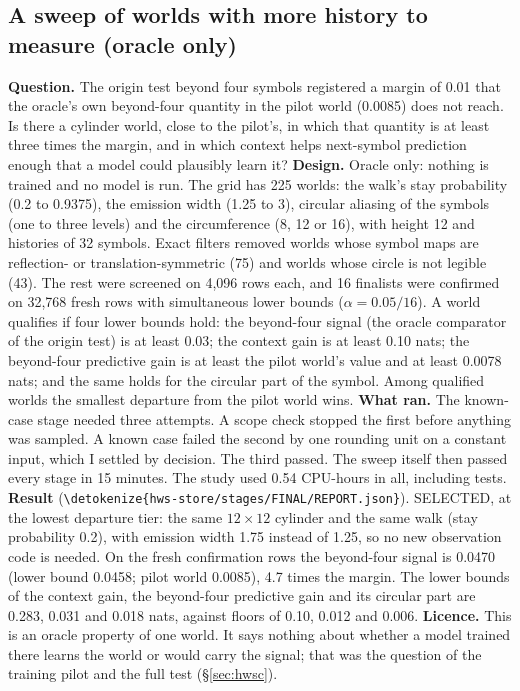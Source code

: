 \documentclass[11pt,a4paper]{article}
\DeclareRobustCommand{\_}{\ifmmode\origunderscore\else\textunderscore\allowbreak\fi}
\DeclareRobustCommand{\fpath}[1]{\begingroup\small\expandafter\nolinkurl\expandafter{\detokenize{#1}}\endgroup}
\begin{document}
\subsection{A sweep of worlds with more history to measure (oracle only)}\label{sec:hws}
\textbf{Question.} The origin test beyond four symbols registered a margin of 0.01 that the
oracle's own beyond-four quantity in the pilot world (0.0085) does not reach. Is there a
cylinder world, close to the pilot's, in which that quantity is at least three times the margin,
and in which context helps next-symbol prediction enough that a model could plausibly learn it?
\textbf{Design.} Oracle only: nothing is trained and no model is run. The grid has 225 worlds:
the walk's stay probability (0.2 to 0.9375), the emission width (1.25 to 3), circular aliasing of
the symbols (one to three levels) and the circumference (8, 12 or 16), with height 12 and
histories of 32 symbols. Exact filters removed worlds whose symbol maps are reflection- or
translation-symmetric (75) and worlds whose circle is not legible (43). The rest were screened on
4,096 rows each, and 16 finalists were confirmed on 32,768 fresh rows with simultaneous lower
bounds ($\alpha=0.05/16$). A world qualifies if four lower bounds hold: the beyond-four signal
(the oracle comparator of the origin test) is at least 0.03; the context gain is at least 0.10
nats; the beyond-four predictive gain is at least the pilot world's value and at least 0.0078
nats; and the same holds for the circular part of the symbol. Among qualified worlds the smallest
departure from the pilot world wins.
\textbf{What ran.} The known-case stage needed three attempts. A scope check stopped the first
before anything was sampled. A known case failed the second by one rounding unit on a constant
input, which I settled by decision. The third passed. The sweep itself then passed every stage
in 15 minutes. The study used 0.54 CPU-hours in all, including tests.
\textbf{Result} (\fpath{hws-store/stages/FINAL/REPORT.json}). SELECTED, at the lowest departure
tier: the same $12\times12$ cylinder and the same walk (stay probability 0.2), with emission
width 1.75 instead of 1.25, so no new observation code is needed. On the fresh confirmation rows
the beyond-four signal is 0.0470 (lower bound 0.0458; pilot world 0.0085), 4.7 times the margin.
The lower bounds of the context gain, the beyond-four predictive gain and its circular part
are 0.283, 0.031 and 0.018 nats, against floors of 0.10, 0.012 and 0.006.
\textbf{Licence.} This is an oracle property of one world. It says nothing about whether a model
trained there learns the world or would carry the signal; that was the question of the training
pilot and the full test (\S\ref{sec:hwsc}).
\end{document}
